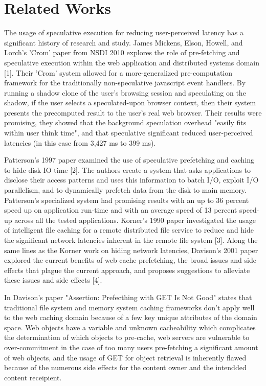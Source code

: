 \section{Related Works}
\label{sec:related}
The usage of speculative execution for reducing user-perceived latency has a significant history of research and study.  James Mickens, Elson, Howell, and Lorch's 
'Crom' paper from NSDI 2010 explores the role of pre-fetching and speculative execution within the web application and distributed systems domain [1]. Their 'Crom' system allowed for a more-generalized pre-computation framework for the traditionally non-speculative javascript event handlers. By running a shadow clone of the user's browsing session and speculating on the shadow, if the user selects a speculated-upon browser context, then their system presents the precomputed result to the user's real web browser. Their results were promising, they showed that the background speculation overhead "easily fits within user think time", and that  speculative significant reduced user-perceived latencies (in this case from 3,427 ms to 399 ms).

Patterson's 1997 paper examined the use of speculative prefetching and caching to hide disk IO time [2]. The authors create a system that asks applications to disclose their access patterns and uses this information to batch I/O, exploit I/O parallelism, and to dynamically prefetch data from the disk to main memory. Patterson's specialized system had promising results with an up to 36 percent speed up on application run-time and with an average speed of 13 percent speed-up across all the tested applications. Korner's 1990 paper investigated the usage of intelligent file caching for a remote distributed file service to reduce and hide the significant network latencies inherent in the remote file system [3]. Along the same lines as the Korner work on hiding network latencies, Davison's 2001 paper explored the current benefits of web cache prefetching, the broad issues and side effects that plague the current approach, and proposes suggestions to alleviate these issues and side effects [4].

In Davison's paper "Assertion: Prefecthing with GET Is Not Good" states that traditional file system and memory system caching frameworks don't apply well to the web caching domain because of a few key unique attributes of the domain space. Web objects have a variable and unknown cacheability which complicates the determination of which objects to pre-cache, web servers are vulnerable to over-commitment in the case of too many users pre-fetching a significant amount of web objects, and the usage of GET for object retrieval is inherently flawed because of the numerous side effects for the content owner and the intendded content receipient.

